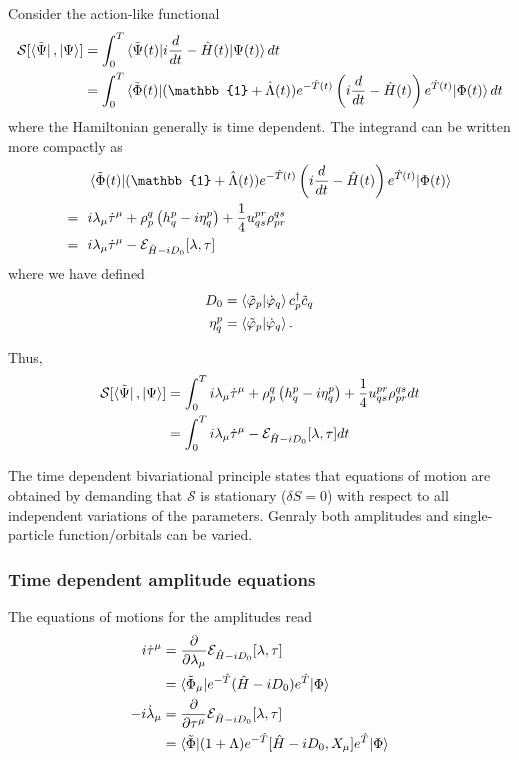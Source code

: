 \documentclass[aip,jcp,reprint,floatfix]{revtex4-1}
\begin{document}
    Consider the action-like functional 
    \begin{align}
    \mathcal{S}[\bra{\tilde{\Psi}}, \ket{\Psi}] &= \int_0^T \braket{\tilde{\Psi}(t)|i\frac{d}{dt}-\hat{H}(t)|\Psi(t)} dt  \nonumber \\ 
    &= \int_0^T \braket{\tilde{\Phi}(t)|(\mathbb{1}+\hat{\Lambda}(t))e^{-\hat{T}(t)}\left(i\frac{d}{dt}-\hat{H}(t)\right) e^{\hat{T}(t)}|\Phi(t)} dt \nonumber 
    \end{align}
    where the Hamiltonian generally is time dependent. The integrand can be written more compactly as 
    \begin{align}
        &\braket{\tilde{\Phi}(t)|(\mathbb{1}+\hat{\Lambda}(t))e^{-\hat{T}(t)}\left(i\frac{d}{dt}-\hat{H}(t)\right) e^{\hat{T}(t)}|\Phi(t)} \nonumber \\ 
        = \ \ & i \lambda_\mu \dot{\tau}^\mu + \rho^q_p \left( h^p_q - i \eta^p_q \right) + \frac{1}{4}u^{pr}_{qs}\rho^{qs}_{pr}  \\
        =\ \ & i \lambda_\mu \dot{\tau}^\mu - \mathcal{E}_{\hat{H}-iD_0}[\lambda, \tau] 
    \end{align}
    where we have defined 
    \begin{align}
        D_0 &= \braket{\tilde{\varphi}_p|\dot{\varphi}_q} c_p^\dagger \tilde{c}_q \\
        \eta^p_q &= \braket{\tilde{\varphi}_p|\dot{\varphi}_q}.
    \end{align}
    
    Thus, 
    \begin{align}
        \mathcal{S}[\bra{\tilde{\Psi}}, \ket{\Psi}] &= \int_0^T i \lambda_\mu \dot{\tau}^\mu + \rho^q_p \left( h^p_q - i \eta^p_q \right) + \frac{1}{4}u^{pr}_{qs}\rho^{qs}_{pr} dt \\
        &= \int_0^T i \lambda_\mu \dot{\tau}^\mu - \mathcal{E}_{\hat{H}-iD_0}[\lambda, \tau] dt
    \end{align}
    
    The time dependent bivariational principle states that equations of motion are obtained by demanding that $\mathcal{S}$ is stationary ($\delta S = 0$) with respect to all independent variations of the parameters. Genraly both amplitudes and single-particle function/orbitals can be varied. 
    \subsubsection{Time dependent amplitude equations}
    The equations of motions for the amplitudes read 
    \begin{align}
    i \dot{\tau}^\mu &= \frac{\partial}{\partial \lambda_\mu} \mathcal{E}_{\hat{H}-iD_0}[\lambda, \tau] \nonumber \\ 
    &=  \braket{\tilde{\Phi}_\mu|e^{-\hat{T}}(\hat{H}-iD_0)e^{\hat{T}}|\Phi} \label{OATDCC_tau_equations} \\
-i \dot{\lambda}_\mu &= \frac{\partial}{\partial \tau^\mu} \mathcal{E}_{\hat{H}-iD_0}[\lambda, \tau] \nonumber \\ 
&=  \braket{\tilde{\Phi}|(1+\Lambda)e^{-\hat{T}}[\hat{H}-iD_0,X_\mu]e^{\hat{T}}|\Phi} \label{OATDCC_lambda_equations}
\end{align}
\end{document}
